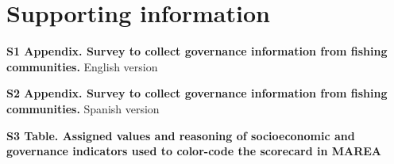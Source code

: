 \documentclass[12pt,]{article}
\begin{document}
\section{Supporting information}\label{supporting-information}

\textbf{S1 Appendix. Survey to collect governance information from
fishing communities.} English version

\textbf{S2 Appendix. Survey to collect governance information from
fishing communities.} Spanish version

\textbf{S3 Table. Assigned values and reasoning of socioeconomic and
governance indicators used to color-code the scorecard in MAREA}
\end{document}

